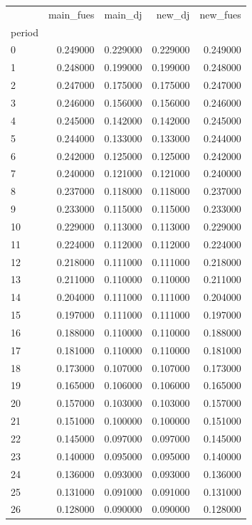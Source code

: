 \begin{tabular}{lrrrr}
\toprule
 & main_fues & main_dj & new_dj & new_fues \\
period &  &  &  &  \\
\midrule
0 & 0.249000 & 0.229000 & 0.229000 & 0.249000 \\
1 & 0.248000 & 0.199000 & 0.199000 & 0.248000 \\
2 & 0.247000 & 0.175000 & 0.175000 & 0.247000 \\
3 & 0.246000 & 0.156000 & 0.156000 & 0.246000 \\
4 & 0.245000 & 0.142000 & 0.142000 & 0.245000 \\
5 & 0.244000 & 0.133000 & 0.133000 & 0.244000 \\
6 & 0.242000 & 0.125000 & 0.125000 & 0.242000 \\
7 & 0.240000 & 0.121000 & 0.121000 & 0.240000 \\
8 & 0.237000 & 0.118000 & 0.118000 & 0.237000 \\
9 & 0.233000 & 0.115000 & 0.115000 & 0.233000 \\
10 & 0.229000 & 0.113000 & 0.113000 & 0.229000 \\
11 & 0.224000 & 0.112000 & 0.112000 & 0.224000 \\
12 & 0.218000 & 0.111000 & 0.111000 & 0.218000 \\
13 & 0.211000 & 0.110000 & 0.110000 & 0.211000 \\
14 & 0.204000 & 0.111000 & 0.111000 & 0.204000 \\
15 & 0.197000 & 0.111000 & 0.111000 & 0.197000 \\
16 & 0.188000 & 0.110000 & 0.110000 & 0.188000 \\
17 & 0.181000 & 0.110000 & 0.110000 & 0.181000 \\
18 & 0.173000 & 0.107000 & 0.107000 & 0.173000 \\
19 & 0.165000 & 0.106000 & 0.106000 & 0.165000 \\
20 & 0.157000 & 0.103000 & 0.103000 & 0.157000 \\
21 & 0.151000 & 0.100000 & 0.100000 & 0.151000 \\
22 & 0.145000 & 0.097000 & 0.097000 & 0.145000 \\
23 & 0.140000 & 0.095000 & 0.095000 & 0.140000 \\
24 & 0.136000 & 0.093000 & 0.093000 & 0.136000 \\
25 & 0.131000 & 0.091000 & 0.091000 & 0.131000 \\
26 & 0.128000 & 0.090000 & 0.090000 & 0.128000 \\

\end{tabular}
